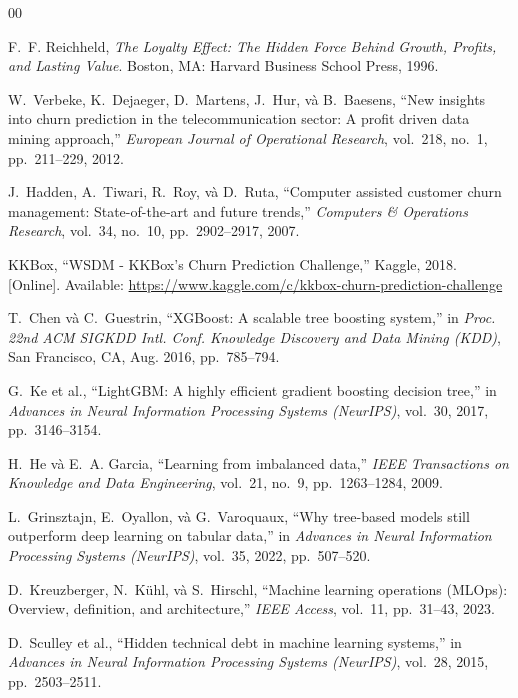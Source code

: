 \documentclass[conference]{IEEEtran}
\begin{document}
\begin{thebibliography}{00}

F.~F. Reichheld,
\textit{The Loyalty Effect: The Hidden Force Behind Growth, Profits, and
Lasting Value}.
Boston, MA: Harvard Business School Press, 1996.

W.~Verbeke, K.~Dejaeger, D.~Martens, J.~Hur, và B.~Baesens,
``New insights into churn prediction in the telecommunication sector:
A profit driven data mining approach,''
\textit{European Journal of Operational Research}, vol.~218, no.~1,
pp.~211--229, 2012.

J.~Hadden, A.~Tiwari, R.~Roy, và D.~Ruta,
``Computer assisted customer churn management: State-of-the-art and future
trends,''
\textit{Computers \& Operations Research}, vol.~34, no.~10,
pp.~2902--2917, 2007.

KKBox,
``WSDM - KKBox's Churn Prediction Challenge,''
Kaggle, 2018.
[Online]. Available: \url{https://www.kaggle.com/c/kkbox-churn-prediction-challenge}

T.~Chen và C.~Guestrin,
``XGBoost: A scalable tree boosting system,''
in \textit{Proc. 22nd ACM SIGKDD Intl. Conf. Knowledge Discovery and Data
Mining (KDD)}, San Francisco, CA, Aug. 2016, pp.~785--794.

G.~Ke et al.,
``LightGBM: A highly efficient gradient boosting decision tree,''
in \textit{Advances in Neural Information Processing Systems (NeurIPS)},
vol.~30, 2017, pp.~3146--3154.

H.~He và E.~A. Garcia,
``Learning from imbalanced data,''
\textit{IEEE Transactions on Knowledge and Data Engineering}, vol.~21, no.~9,
pp.~1263--1284, 2009.

L.~Grinsztajn, E.~Oyallon, và G.~Varoquaux,
``Why tree-based models still outperform deep learning on tabular data,''
in \textit{Advances in Neural Information Processing Systems (NeurIPS)},
vol.~35, 2022, pp.~507--520.

D.~Kreuzberger, N.~Kühl, và S.~Hirschl,
``Machine learning operations (MLOps): Overview, definition, and architecture,''
\textit{IEEE Access}, vol.~11, pp.~31--43, 2023.

D.~Sculley et al.,
``Hidden technical debt in machine learning systems,''
in \textit{Advances in Neural Information Processing Systems (NeurIPS)},
vol.~28, 2015, pp.~2503--2511.


\end{thebibliography}
\end{document}
